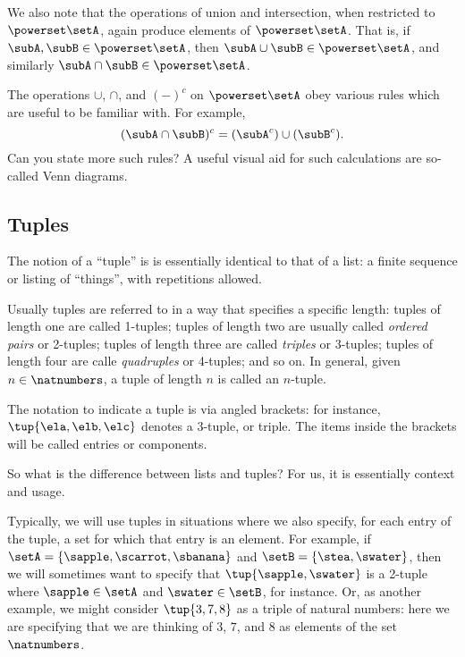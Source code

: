 We also note that the operations of union and intersection, when restricted to $\powerset \setA$, again produce elements of $\powerset \setA$.
That is, if $\subA, \subB \in \powerset \setA$, then $\subA \cup \subB \in \powerset \setA$, and similarly $\subA \cap \subB \in \powerset \setA$.

The operations $\cup$, $\cap$, and $( - )^c$ on $\powerset \setA$ obey various rules which are useful to be familiar with.
For example,
\begin{equation}
    (\subA \cap \subB)^c = (\subA^c) \cup (\subB^c).
\end{equation}
Can you state more such rules?
A useful visual aid for such calculations are so-called Venn diagrams.


\subsection{Tuples}

The notion of a ``tuple'' is is essentially identical to that of a list: a finite sequence or listing of ``things'', with repetitions allowed.

Usually tuples are referred to in a way that specifies a specific length: tuples of length one are called 1-tuples; tuples of length two are usually called \emph{ordered pairs} or 2-tuples; tuples of length three are called \emph{triples} or $3$-tuples; tuples of length four are calle \emph{quadruples} or 4-tuples; and so on.
In general, given $n \in \natnumbers$, a tuple of length $n$ is called an $n$-tuple.

The notation to indicate a tuple is via angled brackets: for instance, $\tup{\ela, \elb, \elc}$ denotes a 3-tuple, or triple.
The items inside the brackets will be called entries or components.

So what is the difference between lists and tuples?
For us, it is essentially context and usage.

Typically, we will use tuples in situations where we also specify, for each entry of the tuple, a set for which that entry is an element.
For example, if $\setA = \{ \sapple, \scarrot, \sbanana \}$ and $\setB = \{ \stea, \swater \}$, then we will sometimes want to specify that $\tup{\sapple, \swater}$ is a 2-tuple where $\sapple \in \setA$ and $\swater \in \setB$, for instance.
Or, as another example, we might consider $\tup{3, 7, 8}$ as a triple of natural numbers: here we are specifying that we are thinking of $3$, $7$, and $8$ as elements of the set $\natnumbers$.

